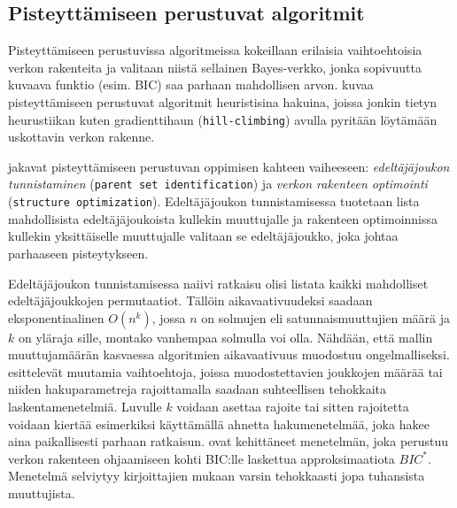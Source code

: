 \subsection{Pisteyttämiseen perustuvat algoritmit} 

Pisteyttämiseen perustuvissa algoritmeissa kokeillaan erilaisia vaihtoehtoisia verkon rakenteita ja valitaan niistä sellainen Bayes-verkko, jonka sopivuutta kuvaava funktio (esim. BIC) saa parhaan mahdollisen arvon. \citet{scutari_learning_2010} kuvaa pisteyttämiseen perustuvat algoritmit heuristisina hakuina, joissa jonkin tietyn heurustiikan kuten gradienttihaun (\texttt{hill-climbing}) avulla pyritään löytämään uskottavin verkon rakenne. 

\citet{scanagatta_survey_2019} jakavat pisteyttämiseen perustuvan oppimisen kahteen vaiheeseen: \emph{edeltäjäjoukon tunnistaminen} (\texttt{parent set identification}) ja \emph{verkon rakenteen optimointi} (\texttt{structure optimization}). Edeltäjäjoukon tunnistamisessa tuotetaan lista mahdollisista edeltäjäjoukoista kullekin muuttujalle ja rakenteen optimoinnissa kullekin yksittäiselle muuttujalle valitaan se edeltäjäjoukko, joka johtaa parhaaseen pisteytykseen.  

Edeltäjäjoukon tunnistamisessa naiivi ratkaisu olisi listata kaikki mahdolliset edeltäjäjoukkojen permutaatiot. Tällöin aikavaativuudeksi saadaan eksponentiaalinen $O(n^k)$, jossa $n$ on solmujen eli satunnaismuuttujien määrä ja $k$ on yläraja sille, montako vanhempaa solmulla voi olla. Nähdään, että mallin muuttujamäärän kasvaessa algoritmien aikavaativuus muodostuu ongelmalliseksi. \citet{scanagatta_survey_2019} esittelevät muutamia vaihtoehtoja, joissa muodostettavien joukkojen määrää tai niiden hakuparametreja rajoittamalla saadaan suhteellisen tehokkaita laskentamenetelmiä. Luvulle $k$ voidaan asettaa rajoite tai sitten rajoitetta voidaan kiertää esimerkiksi käyttämällä ahnetta hakumenetelmää, joka hakee aina paikallisesti parhaan ratkaisun. \citet{scanagatta_learning_2015} ovat kehittäneet menetelmän, joka perustuu verkon rakenteen ohjaamiseen kohti BIC:lle laskettua approksimaatiota $BIC^*$. Menetelmä selviytyy kirjoittajien mukaan varsin tehokkaasti jopa tuhansista muuttujista.  


